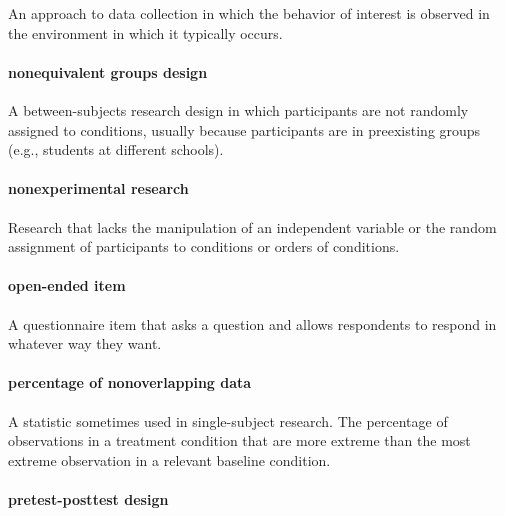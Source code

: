 \documentclass[
]{krantz}
\begin{document}
An approach to data collection in which the behavior of interest is observed in the environment in which it typically occurs.

\paragraph*{nonequivalent groups design}\label{nonequivalent-groups-design-1}

A between-subjects research design in which participants are not randomly assigned to conditions, usually because participants are in preexisting groups (e.g., students at different schools).

\paragraph*{nonexperimental research}\label{nonexperimental-research}

Research that lacks the manipulation of an independent variable or the random assignment of participants to conditions or orders of conditions.

\paragraph*{open-ended item}\label{open-ended-item}

A questionnaire item that asks a question and allows respondents to respond in whatever way they want.

\paragraph*{percentage of nonoverlapping data}\label{percentage-of-nonoverlapping-data}

A statistic sometimes used in single-subject research. The percentage of observations in a treatment condition that are more extreme than the most extreme observation in a relevant baseline condition.

\paragraph*{pretest-posttest design}\label{pretest-posttest-design-1}
\end{document}
